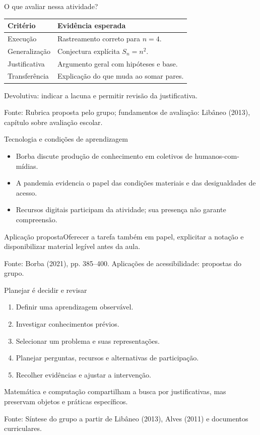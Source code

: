 \documentclass[aspectratio=169,11pt]{beamer}
\newcommand{\fonte}[1]{\par\vfill{\tiny\color{gray}Fonte: #1}}
\begin{document}
\begin{frame}{O que avaliar nessa atividade?}
\begin{tabular}{p{}p{}}\textbf{Critério}&\textbf{Evidência esperada}\\\hline Execução&Rastreamento correto para $n=4$.\\ Generalização&Conjectura explícita $S_n=n^2$.\\ Justificativa&Argumento geral com hipóteses e base.\\ Transferência&Explicação do que muda ao somar pares.\end{tabular}\par\medskip Devolutiva: indicar a lacuna e permitir revisão da justificativa.
\fonte{Rubrica proposta pelo grupo; fundamentos de avaliação: Libâneo (2013), capítulo sobre avaliação escolar.}
\end{frame}
\begin{frame}{Tecnologia e condições de aprendizagem}
\begin{itemize}\item Borba discute produção de conhecimento em coletivos de humanos-com-mídias.\item A pandemia evidencia o papel das condições materiais e das desigualdades de acesso.\item Recursos digitais participam da atividade; sua presença não garante compreensão.\end{itemize}\begin{block}{Aplicação proposta}Oferecer a tarefa também em papel, explicitar a notação e disponibilizar material legível antes da aula.\end{block}
\fonte{Borba (2021), pp. 385--400. Aplicações de acessibilidade: propostas do grupo.}
\end{frame}
\begin{frame}{Planejar é decidir e revisar}
\begin{enumerate}\item Definir uma aprendizagem observável.\item Investigar conhecimentos prévios.\item Selecionar um problema e suas representações.\item Planejar perguntas, recursos e alternativas de participação.\item Recolher evidências e ajustar a intervenção.\end{enumerate}\medskip Matemática e computação compartilham a busca por justificativas, mas preservam objetos e práticas específicos.
\fonte{Síntese do grupo a partir de Libâneo (2013), Alves (2011) e documentos curriculares.}
\end{frame}
\end{document}
